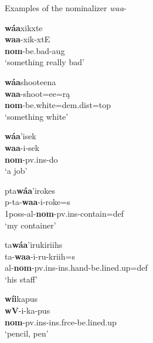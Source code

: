 \begin{exe}

\item\label{NOMexampleWAA} Examples of the nominalizer \textit{waa}-

    \begin{xlist}
    
    \item\label{NOMexampleWAA1} \glll \textbf{wáa}xikxte\\
    \textbf{waa}-xik-xtE\\
    \textbf{nom}-\textnormal{be.bad}-aug\\
    \glt `something really bad' \citep[46]{hollow1973a}
    
    \item\label{NOMexampleWAA2} \glll \textbf{wáa}shooteena\\
    \textbf{waa}-shoot=ee=rą\\
    \textbf{nom}-\textnormal{be.white}=dem.dist=top\\
    \glt `something white' \citep[106]{hollow1973a}
    
    \item\label{NOMexampleWAA3} \glll \textbf{wáa}'isek\\
    \textbf{waa}-i-sek\\
    \textbf{nom}-pv.ins-\textnormal{do}\\
    \glt `a job' \citep[229]{trechter2012}
    
    \item\label{NOMexampleWAA4} \glll pta\textbf{wáa}'irokes\\
    p-ta-\textbf{waa}-i-roke=s\\
    1poss-al-\textbf{nom}-pv.ins-\textnormal{contain}=def\\
    \glt `my container' \citep[118]{trechter2012}
    
    \item\label{NOMexampleWAA5} \glll ta\textbf{wáa}'irukiriihs\\
    ta-\textbf{waa}-i-ru-kriih=s\\
    al-\textbf{nom}-pv.ins-ins.hand-\textnormal{be.lined.up}=def\\
    \glt `his staff' \citep[7]{hollow1973a}
    
    \item\label{NOMexampleWAA6} \glll \textbf{wíi}kapus\\
    \textbf{wV}-i-ka-pus\\
    \textbf{nom}-pv.ins-ins.frce-\textnormal{be.lined.up}\\
    \glt `pencil, pen' \citep[159]{hollow1970}
    

\end{xlist}
\end{exe}
